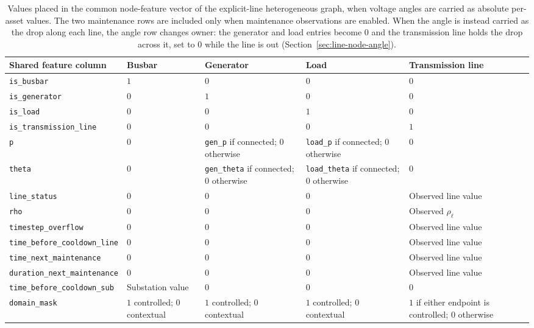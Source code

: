 \begin{table}[H]
  \centering
  \scriptsize
  \caption{Values placed in the common node-feature vector of the
  explicit-line heterogeneous graph, when voltage angles are carried as
  absolute per-asset values. The two maintenance rows are included only when
  maintenance observations are enabled. When the angle is instead carried as
  the drop along each line, the angle row changes owner: the generator and load
  entries become $0$ and the transmission line holds the drop across it, set to
  $0$ while the line is out (Section~\ref{sec:line-node-angle}).}
  \label{tab:heterogeneous-line-node-features}
  \setlength{\tabcolsep}{3pt}
  \begin{tabular}{L{0.30\textwidth}L{0.10\textwidth}L{0.14\textwidth}L{0.14\textwidth}L{0.20\textwidth}}
    \toprule
    Shared feature column & Busbar & Generator & Load & Transmission line \\
    \midrule
    \texttt{is\_busbar} & $1$ & $0$ & $0$ & $0$ \\
    \texttt{is\_generator} & $0$ & $1$ & $0$ & $0$ \\
    \texttt{is\_load} & $0$ & $0$ & $1$ & $0$ \\
    \texttt{is\_transmission\_line} & $0$ & $0$ & $0$ & $1$ \\
    \texttt{p} & $0$ & \texttt{gen\_p} if connected; $0$ otherwise & \texttt{load\_p} if connected; $0$ otherwise & $0$ \\
    \texttt{theta} & $0$ & \texttt{gen\_theta} if connected; $0$ otherwise & \texttt{load\_theta} if connected; $0$ otherwise & $0$ \\
    \texttt{line\_status} & $0$ & $0$ & $0$ & Observed line value \\
    \texttt{rho} & $0$ & $0$ & $0$ & Observed $\rho_\ell$ \\
    \texttt{timestep\_overflow} & $0$ & $0$ & $0$ & Observed line value \\
    \texttt{time\_before\_cooldown\_line} & $0$ & $0$ & $0$ & Observed line value \\
    \texttt{time\_next\_maintenance} & $0$ & $0$ & $0$ & Observed line value \\
    \texttt{duration\_next\_maintenance} & $0$ & $0$ & $0$ & Observed line value \\
    \texttt{time\_before\_cooldown\_sub} & Substation value & $0$ & $0$ & $0$ \\
    \texttt{domain\_mask} & $1$ controlled; $0$ contextual & $1$ controlled; $0$ contextual & $1$ controlled; $0$ contextual & $1$ if either endpoint is controlled; $0$ otherwise \\
    \bottomrule
  \end{tabular}
\end{table}

